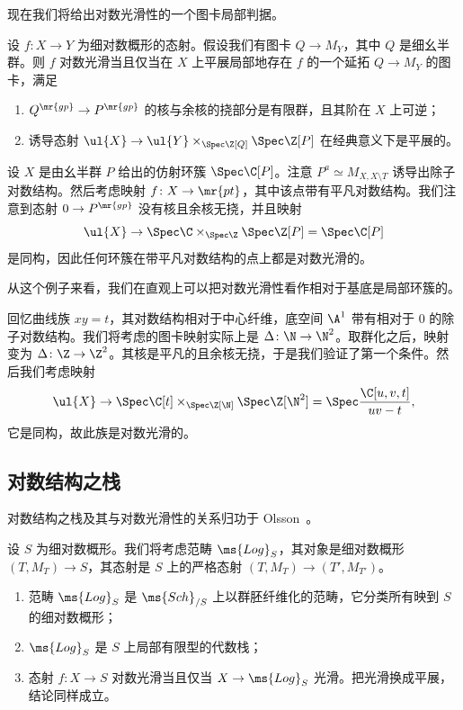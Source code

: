 现在我们将给出对数光滑性的一个图卡局部判据。

\begin{thm}
    设 \(f \colon X \to Y\) 为细对数概形的态射。假设我们有图卡 \(Q \to M_Y\)，其中 \(Q\) 是细幺半群。则 \(f\) 对数光滑当且仅当在 \(X\) 上平展局部地存在 \(f\) 的一个延拓 \(Q \to M_Y\) 的图卡，满足
    \begin{enumerate}
        \item \(Q^{\mr{gp}} \to P^{\mr{gp}}\) 的核与余核的挠部分是有限群，且其阶在 \(X\) 上可逆；
        \item 诱导态射 \(\ul{X} \to \ul{Y} \times_{\Spec \Z[Q]} \Spec \Z[P]\) 在经典意义下是平展的。
    \end{enumerate}
\end{thm}

\begin{exm}
    设 \(X\) 是由幺半群 \(P\) 给出的仿射环簇 \(\Spec \C[P]\)。注意 \(P^a \simeq M_{X, X \setminus T}\) 诱导出除子对数结构。然后考虑映射 \(f \colon X \to \mr{pt}\)，其中该点带有平凡对数结构。我们注意到态射 \(0 \to P^{\mr{gp}}\) 没有核且余核无挠，并且映射
    \[ \ul{X} \to \Spec \C \times_{\Spec \Z} \Spec \Z[P] = \Spec \C[P] \]
    是同构，因此任何环簇在带平凡对数结构的点上都是对数光滑的。
\end{exm}

从这个例子来看，我们在直观上可以把对数光滑性看作相对于基底是局部环簇的。

\begin{exm}
    回忆曲线族 \(xy = t\)，其对数结构相对于中心纤维，底空间 \(\A^1\) 带有相对于 \(0\) 的除子对数结构。我们将考虑的图卡映射实际上是 \(\Delta \colon \N \to \N^2\)。取群化之后，映射变为 \(\Delta \colon \Z \to \Z^2\)。其核是平凡的且余核无挠，于是我们验证了第一个条件。然后我们考虑映射
    \[ \ul{X} \to \Spec \C[t] \times_{\Spec \Z[\N]} \Spec \Z[\N^2] = \Spec \frac{\C[u,v,t]}{uv-t}, \]
    它是同构，故此族是对数光滑的。
\end{exm}

\subsection{对数结构之栈}%
\label{sub:Stack of log structures}

对数结构之栈及其与对数光滑性的关系归功于 Olsson~\cite{Olsson2003}。

设 \(S\) 为细对数概形。我们将考虑范畴 \(\ms{Log}_S\)，其对象是细对数概形 \((T, M_T) \to S\)，其态射是 \(S\) 上的严格态射 \((T, M_T) \to (T', M_{T'})\)。
\begin{enumerate}
    \item 范畴 \(\ms{Log}_S\) 是 \(\ms{Sch}_{/S}\) 上以群胚纤维化的范畴，它分类所有映到 \(S\) 的细对数概形；
    \item \(\ms{Log}_S\) 是 \(S\) 上局部有限型的代数栈；
    \item 态射 \(f \colon X \to S\) 对数光滑当且仅当 \(X \to \ms{Log}_S\) 光滑。把光滑换成平展，结论同样成立。
\end{enumerate}

